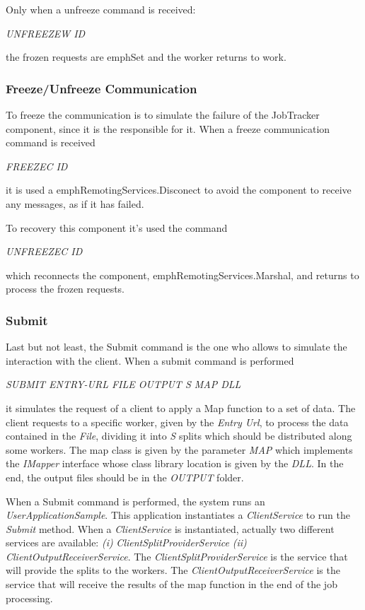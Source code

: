 \documentclass[times, 10pt,twocolumn]{article}
\begin{document}
            Only when a unfreeze command is received:

            \emph{UNFREEZEW ID}

            the frozen requests are emph{Set} and the worker returns to work.

            \subsubsection{Freeze/Unfreeze Communication}
            To freeze the communication is to simulate the failure of the JobTracker component, since it is the responsible for it. When a freeze communication command is received

	        \emph{FREEZEC ID}

	        it is used a emph{RemotingServices.Disconect} to avoid the component to receive any messages, as if it has failed.

	        To recovery this component it's used the command

	        \emph{UNFREEZEC ID}

	        which reconnects the component, emph{RemotingServices.Marshal}, and returns to process the frozen requests.

            \subsubsection{Submit}
            Last but not least, the Submit command is the one who allows to simulate the interaction with the client. When a submit command is performed

            \emph{SUBMIT ENTRY-URL FILE OUTPUT S MAP DLL}

            it simulates the request of a client to apply a Map function to a set of data. The client requests to a specific worker, given by the \emph{Entry Url}, to process the data contained in the \emph{File}, dividing it into \emph{S} splits which should be distributed along some workers. The map class is given by the parameter \emph{MAP} which implements the \emph{IMapper} interface whose class library location is given by the \emph{DLL}. In the end, the output files should be in the \emph{OUTPUT} folder.

            When a Submit command is performed, the system runs an \emph{UserApplicationSample}. This application instantiates a \emph{ClientService} to run the \emph{Submit} method.
            When a \emph{ClientService} is instantiated, actually two different services are available: {\it (i)} \emph{ClientSplitProviderService} {\it (ii)} \emph{ClientOutputReceiverService}. The \emph{ClientSplitProviderService} is the service that will provide the splits to the workers. The \emph{ClientOutputReceiverService} is the service that will receive the results of the map function in the end of the job processing.
\end{document}
